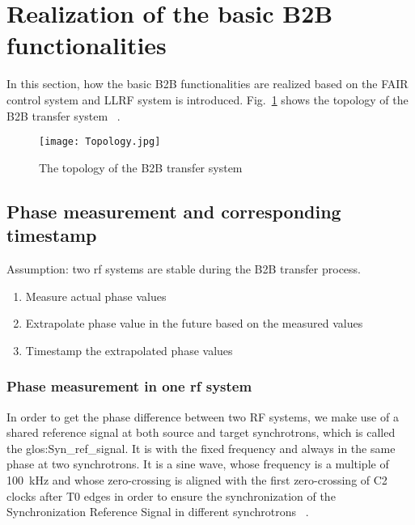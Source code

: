 \section{Realization of the basic B2B functionalities}
In this section, how the basic B2B functionalities are realized based on the FAIR control system and LLRF system is introduced.
Fig.~\ref{Topology} shows the topology of the B2B transfer system ~\cite{bai_bunch_2015, bai_concept_2016}.
\begin{figure}[!htb]
   \centering   
   \texttt{[image: Topology.jpg]}
   \caption{The topology of the B2B transfer system}
   \label{Topology}
\end{figure}
%
\subsection{Phase measurement and corresponding timestamp}
Assumption: two rf systems are stable during the B2B transfer process.
\begin{enumerate}
\item Measure actual phase values
\item Extrapolate phase value in the future based on the measured values
\item Timestamp the extrapolated phase values
\end{enumerate}
 \subsubsection{Phase measurement in one rf system}
In order to get the phase difference between two RF systems, we make use of a shared reference signal at both source and target synchrotrons, which is called the \gls{glos:Syn_ref_signal}. It is with the fixed frequency and always in the same phase at two synchrotrons. It is a sine wave, whose frequency is a multiple of \SI{100}{kHz} and whose zero-crossing is aligned with the first zero-crossing of C2 clocks after T0 edges in order to ensure the synchronization of the Synchronization Reference Signal in different synchrotrons ~\cite{ferrand_system_2014, ferrand_system_2015}. 

